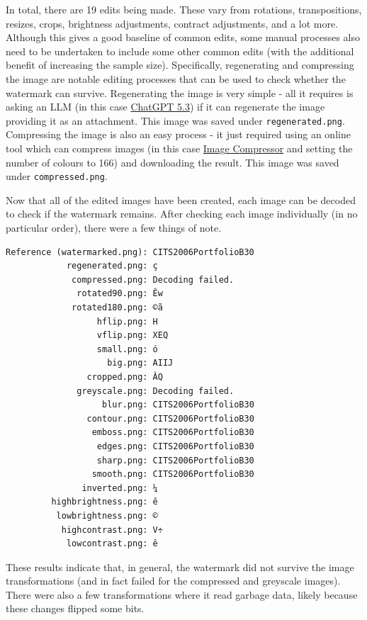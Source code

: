 In total, there are 19 edits being made. These vary from rotations,
transpositions, resizes, crops, brightness adjustments, contract
adjustments, and a lot more. Although this gives a good baseline of
common edits, some manual processes also need to be undertaken to
include some other common edits (with the additional benefit of
increasing the sample size). Specifically, regenerating and compressing
the image are notable editing processes that can be used to check
whether the watermark can survive. Regenerating the image is very simple
- all it requires is asking an LLM (in this case
\href{https://chatgpt.com/share/69f60400-02ec-8321-bc81-3f6d2fdf0dad}{ChatGPT
5.3}) if it can regenerate the image providing it as an attachment. This
image was saved under \texttt{regenerated.png}. Compressing the image is
also an easy process - it just required using an online tool which can
compress images (in this case \href{https://imagecompressor.com/}{Image
Compressor} and setting the number of colours to 166) and downloading
the result. This image was saved under \texttt{compressed.png}.

Now that all of the edited images have been created, each image can be
decoded to check if the watermark remains. After checking each image
individually (in no particular order), there were a few things of note.

\begin{verbatim}
Reference (watermarked.png): CITS2006PortfolioB30
            regenerated.png: ç
             compressed.png: Decoding failed.
              rotated90.png: Êw
             rotated180.png: ©ã
                  hflip.png: H
                  vflip.png: XEQ
                  small.png: ó
                    big.png: AIIJ
                cropped.png: ÂQ
              greyscale.png: Decoding failed.
                   blur.png: CITS2006PortfolioB30
                contour.png: CITS2006PortfolioB30
                 emboss.png: CITS2006PortfolioB30
                  edges.png: CITS2006PortfolioB30
                  sharp.png: CITS2006PortfolioB30
                 smooth.png: CITS2006PortfolioB30
               inverted.png: ¼
         highbrightness.png: ê
          lowbrightness.png: ©
           highcontrast.png: V÷
            lowcontrast.png: ê
\end{verbatim}

These results indicate that, in general, the watermark did not survive
the image transformations (and in fact failed for the compressed and
greyscale images). There were also a few transformations where it read
garbage data, likely because these changes flipped some bits.

